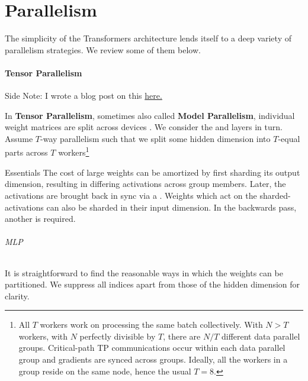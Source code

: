 \part{Parallelism}

The simplicity of the Transformers architecture lends itself to a deep variety of parallelism
strategies. We review some of them below.

\subsection{Tensor Parallelism \label{subsec_tensor_parallelism} }

\begin{commentbox}{Side Note: }
    I wrote a blog post on this \href{https://www.determined.ai/blog/tp}{here.}
\end{commentbox}


In \textbf{Tensor Parallelism}, sometimes also called \textbf{Model Parallelism}, individual weight
matrices are split across devices \cite{shoeybi2020megatronlm}. We consider the  and
 layers in turn. Assume $ T $-way parallelism such that we split some
hidden dimension into $ T $-equal parts across $ T $ workers\footnote{All $ T $ workers work on
    processing the same batch collectively.  With $ N>T $ workers, with $ N $ perfectly divisible by
    $ T $, there are $ N/T $ different data parallel groups. Critical-path TP communications occur
    within each data parallel group and gradients are synced across groups. Ideally, all the workers
    in a group reside on the same node, hence the usual $ T=8 $.}


\begin{nicebox}{Essentials}
	The cost of large weights can be amortized by first sharding its output dimension, resulting in
	differing activations across group members. Later, the activations are brought back in sync via
	a . Weights which act on the sharded-activations can also be sharded in their
	input dimension. In the backwards pass, another  is required.
\end{nicebox}

\paragraph{MLP}
It is straightforward to find the reasonable ways in which the weights can be partitioned. We
suppress all indices apart from those of the hidden dimension for clarity.

